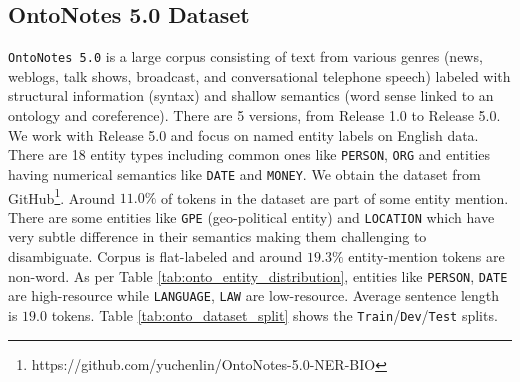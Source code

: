 \subsection{OntoNotes 5.0 Dataset}

\texttt{OntoNotes 5.0}\cite{weischedel2013ontonotes} is a large corpus consisting of text from various genres (news, weblogs, talk shows, broadcast, and conversational
telephone speech) labeled with structural information (syntax) and shallow semantics (word sense linked to an ontology and coreference). There are
5 versions, from Release 1.0 to Release 5.0. We work with Release 5.0 and focus on named entity labels on English data. There are 18 entity types including common ones like \texttt{PERSON}, \texttt{ORG} and entities having numerical semantics like \texttt{DATE} and \texttt{MONEY}. We obtain the dataset from GitHub\footnote{https://github.com/yuchenlin/OntoNotes-5.0-NER-BIO}. Around $11.0\%$ of tokens in the dataset are part of some entity mention. There are some entities like \texttt{GPE} (geo-political entity) and \texttt{LOCATION} which have very subtle difference in their semantics making them challenging to disambiguate. Corpus is flat-labeled and around $19.3\%$  entity-mention tokens are non-word. As per Table \ref{tab:onto_entity_distribution}, entities like \texttt{PERSON}, \texttt{DATE} are high-resource while \texttt{LANGUAGE}, \texttt{LAW} are low-resource. Average sentence length is $19.0$ tokens. Table \ref{tab:onto_dataset_split} shows the \texttt{Train}/\texttt{Dev}/\texttt{Test} splits. 

